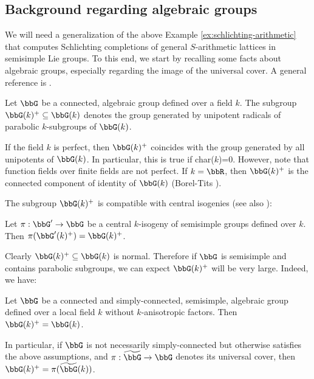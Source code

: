 \subsection{Background regarding algebraic groups}\label{sec:back}
We will need a generalization of the above Example \ref{ex:schlichting-arithmetic} that computes Schlichting completions of general $S$-arithmetic lattices in semisimple Lie groups. To this end, we start by recalling some facts about algebraic groups, especially regarding the image of the universal cover. A general reference is \cite[\S\S 1.1 \& 1.2]{margulis-book}.

Let $\bbG$ be a connected, algebraic group defined over a field $k$. The subgroup $\bbG(k)^+\subseteq \bbG(k)$ denotes the group generated by unipotent radicals of parabolic $k$-subgroups of $\bbG(k)$.

\begin{rem} If the field $k$ is perfect, then $\bbG(k)^+$ coincides with the group generated by all unipotents of $\bbG(k)$. In particular, this is true if char($k$)=0. However, note that function fields over finite fields are not perfect. If $k=\bbR$, then $\bbG(k)^+$ is the connected component of identity of $\bbG(k)$ (Borel-Tits \cite[Prop.\,6.14]{borel-tits-morphismes-abstraits}).\end{rem}
The subgroup $\bbG(k)^+$ is compatible with central isogenies (see also \cite[Prop.\,I.1.5.5]{margulis-book}):
\begin{prop}\label{prop:plus-isogeny}
Let $\pi:\bbG'\to \bbG$ be a central $k$\nobreakdash-isogeny of semisimple groups defined over $k$. Then $\pi(\bbG'(k)^+)=\bbG(k)^+$. \end{prop}
Clearly $\bbG(k)^+\subseteq \bbG(k)$ is normal. Therefore if $\bbG$ is semisimple and contains parabolic subgroups, we can expect $\bbG(k)^+$ will be very large. Indeed, we have:
\begin{thm}\label{thm:ktconj}
Let $\bbG$ be a connected and simply-connected, semisimple, algebraic group defined over a local field $k$ without $k$-anisotropic factors. Then $\bbG(k)^+=\bbG(k)$.

In particular, if $\bbG$ is not necessarily simply-connected but otherwise satisfies the above assumptions, and $\pi:\widetilde{\bbG}\to\bbG$ denotes its universal cover, then $\bbG(k)^+=\pi(\widetilde{\bbG}(k))$.
\end{thm}

